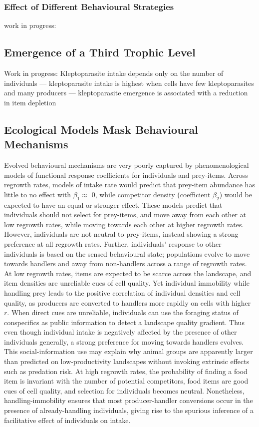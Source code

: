 \documentclass[11pt]{article}
\begin{document}
\subsubsection*{Effect of Different Behavioural Strategies}

work in progress: 

\subsection*{Emergence of a Third Trophic Level}

Work in progress: Kleptoparasite intake depends only on the number of individuals --- kleptoparasite intake is highest when cells have few kleptoparasites and many producers --- kleptoparasite emergence is associated with a reduction in item depletion

\subsection*{Ecological Models Mask Behavioural Mechanisms}

Evolved behavioural mechanisms are very poorly captured by phenomenological models of functional response coefficients for individuals and prey-items.
Across regrowth rates, models of intake rate would predict that prey-item abundance has little to no effect with $\beta_1 \approx$ 0, while competitor density (coefficient $\beta_2$) would be expected to have an equal or stronger effect.
These models predict that individuals should not select for prey-items, and move away from each other at low regrowth rates, while moving towards each other at higher regrowth rates.
However, individuals are not neutral to prey-items, instead showing a strong preference at all regrowth rates.
Further, individuals' response to other individuals is based on the sensed behavioural state; populations evolve to move towards handlers and away from non-handlers across a range of regrowth rates.
At low regrowth rates, items are expected to be scarce across the landscape, and item densities are unreliable cues of cell quality.
Yet individual immobility while handling prey leads to the positive correlation of individual densities and cell quality, as producers are converted to handlers more rapidly on cells with higher $r$.
When direct cues are unreliable, individuals can use the foraging status of conspecifics as public information to detect a landscape quality gradient.
Thus even though individual intake is negatively affected by the presence of other individuals generally, a strong preference for moving towards handlers evolves.
This social-information use may explain why animal groups are apparently larger than predicted on low-productivity landscapes without invoking extrinsic effects such as predation risk.
At high regrowth rates, the probability of finding a food item is invariant with the number of potential competitors, food items are good cues of cell quality, and selection for individuals becomes neutral.
Nonetheless, handling-immobility ensures that most producer-handler conversions occur in the presence of already-handling individuals, giving rise to the spurious inference of a facilitative effect of individuals on intake.
\end{document}
